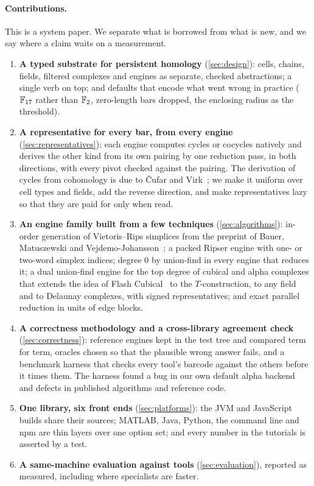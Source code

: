 \paragraph{Contributions.}
This is a system paper. We separate what is borrowed from what is new, and
we say where a claim waits on a measurement.
\begin{enumerate}[label=\textbf{C\arabic*.}, leftmargin=2.2em, itemsep=2pt]
\item \textbf{A typed substrate for persistent homology} (\cref{sec:design}): cells, chains, fields, filtered complexes and
  engines as separate, checked abstractions; a single verb on top; and defaults that encode what went wrong in practice
  ($\mathbb{F}_{17}$ rather than $\mathbb{F}_2$, zero-length bars dropped, the enclosing radius as the threshold).
\item \textbf{A representative for every bar, from every engine} (\cref{sec:representatives}): each engine computes cycles or
  cocycles natively and derives the other kind from its own pairing by one reduction pass, in both directions, with every pivot
  checked against the pairing. The derivation of cycles from cohomology is due to \v{C}ufar and
  Virk~\cite{cufar2021involuted}; we make it uniform over cell types and fields, add the reverse direction, and make
  representatives lazy so that they are paid for only when read.
\item \textbf{An engine family built from a few techniques} (\cref{sec:algorithms}): in-order generation of
  Vietoris--Rips simplices from the preprint of Bauer, Matuszewski and Vejdemo-Johansson~\cite{bauer2024generating}; a packed
  Ripser engine with one- or two-word simplex indices; degree $0$ by union-find in every engine that reduces it; a dual
  union-find engine for the top degree of cubical and alpha complexes that extends the idea of Flash
  Cubical~\cite{lebreton2026flash} to the $T$-construction, to any field and to Delaunay complexes, with signed
  representatives; and exact parallel reduction in units of edge blocks.
\item \textbf{A correctness methodology and a cross-library agreement check} (\cref{sec:correctness}): reference engines kept in the
  test tree and compared term for term, oracles chosen so that the plausible wrong answer fails, and a benchmark harness that checks
  every tool's barcode against the others before it times them. The harness found a bug in our own default alpha backend and
  defects in published algorithms and reference code.
\item \textbf{One library, six front ends} (\cref{sec:platforms}): the JVM and JavaScript builds share their sources;
  MATLAB, Java, Python, the command line and npm are thin layers over one option set; and every number in the
  tutorials is asserted by a test.
\item \textbf{A same-machine evaluation against  tools} (\cref{sec:evaluation}), reported as measured,
  including where specialists are faster.
\end{enumerate}

